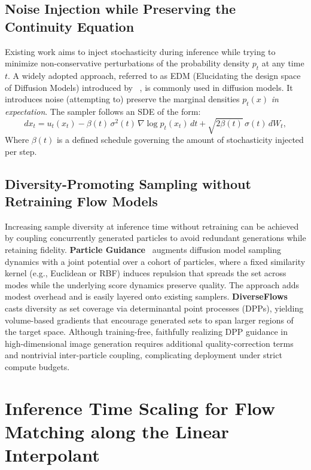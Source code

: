 \documentclass{article} %
\begin{document}
\subsection{Noise Injection while Preserving the Continuity Equation}
Existing work aims to inject stochasticity during inference while trying to minimize non-conservative perturbations of the probability density $p_t$ at any time $t$. A widely adopted approach, referred to as EDM (Elucidating the design space of Diffusion Models) introduced by ~\cite{karras2022elucidatingdesignspacediffusionbased}, is commonly used in diffusion models. It introduces noise (attempting to) preserve the marginal densities \(p_t(x)\) \emph{in expectation}. The sampler follows an SDE of the form:
\[
d x_t = u_t(x_t) - \beta(t)\,\sigma^2(t)\,\nabla \log p_t(x_t)\,dt + \sqrt{2\beta(t)}\,\sigma(t)\,dW_t,
\]
Where \(\beta(t)\) is a defined schedule governing the amount of stochasticity injected per step. 

\subsection{Diversity-Promoting Sampling without Retraining Flow Models}
Increasing sample diversity at inference time without retraining can be achieved by coupling concurrently generated particles to avoid redundant generations while retaining fidelity. \textbf{Particle Guidance}~\cite{corso2023particleguidancenoniiddiverse} augments diffusion model sampling dynamics with a joint potential over a cohort of particles, where a fixed similarity kernel (e.g., Euclidean or RBF) induces repulsion that spreads the set across modes while the underlying score dynamics preserve quality. The approach adds modest overhead and is easily layered onto existing samplers. \textbf{DiverseFlows}~\cite{morshed2025diverseflowsampleefficientdiversemode} casts diversity as set coverage via determinantal point processes (DPPs), yielding volume-based gradients that encourage generated sets to span larger regions of the target space. Although training-free, faithfully realizing DPP guidance in high-dimensional image generation requires additional quality-correction terms and nontrivial inter-particle coupling, complicating deployment under strict compute budgets.

\section{Inference Time Scaling for Flow Matching along the Linear Interpolant}
\end{document}
